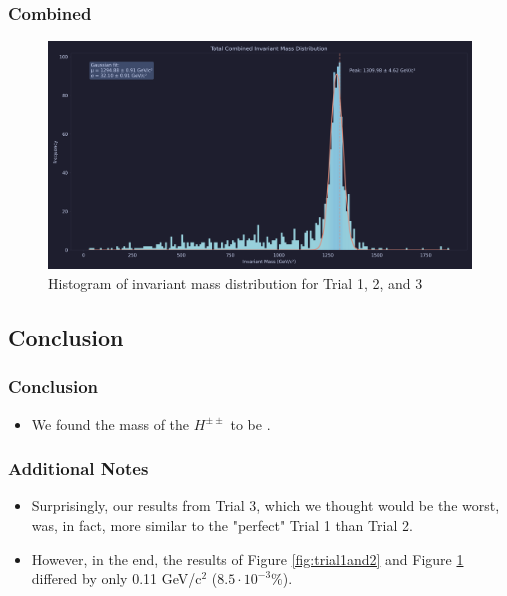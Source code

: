 \documentclass{beamer}
\begin{document}
\begin{frame}
\frametitle{Combined}
\begin{figure}
    \centering
    \includegraphics[width=1\textwidth]{dongimages/combined.png}
    \caption{Histogram of invariant mass distribution for Trial 1, 2, and 3}
    \label{fig:trialCombined}
\end{figure}
\end{frame}

\subsection{Conclusion}
\begin{frame}
\frametitle{Conclusion}
\begin{itemize}
    \item<1-> We found the mass of the $H^{\pm\pm}$ to be .
\end{itemize}
\end{frame}

\begin{frame}
\frametitle{Additional Notes}
\begin{itemize}
    \item<1-> Surprisingly, our results from Trial 3, which we thought would be the worst, was, in fact, more similar to the "perfect" Trial 1 than Trial 2.
    \item<2-> However, in the end, the results of Figure \ref{fig:trial1and2} and Figure \ref{fig:trialCombined} differed by only 0.11 GeV/c$^2$ ($8.5\cdot10^{-3}\%$).
\end{itemize}
\end{frame}
\end{document}
